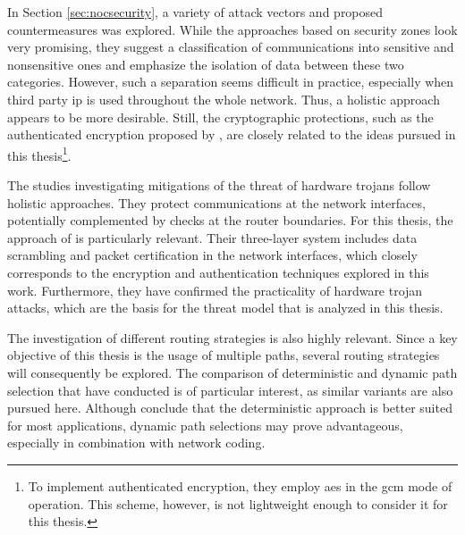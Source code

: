 In Section \ref{sec:nocsecurity}, a variety of attack vectors and proposed countermeasures was explored. While the approaches based on security zones
look very promising, they suggest a classification of communications into sensitive and nonsensitive ones and emphasize the isolation of data between these two
categories. However, such a separation seems difficult in practice, especially when third party \gls{ip} is used throughout the whole network. Thus, a
holistic approach appears to be more desirable. Still, the cryptographic protections, such as the authenticated encryption proposed by
\citeauthor{kapoor13nocauthenc} \cite{kapoor13nocauthenc}, are closely related to the ideas pursued in this thesis\footnote{To implement authenticated
encryption, they employ \gls{aes} in the \gls{gcm} mode of operation. This scheme, however, is not lightweight enough to consider it for this thesis.}.

The studies investigating mitigations of the threat of hardware trojans follow holistic approaches. They protect communications at the network
interfaces, potentially complemented by checks at the router boundaries. For this thesis, the approach of \citeauthor{ancajas14fortnocs}
\cite{ancajas14fortnocs} is particularly relevant. Their three-layer system includes data scrambling and packet certification in the network
interfaces, which closely corresponds to the encryption and authentication techniques explored in this work. Furthermore, they have confirmed the
practicality of hardware trojan attacks, which are the basis for the threat model that is analyzed in this thesis.

The investigation of different routing strategies is also highly relevant. Since a key objective of this thesis is the usage of multiple paths, several
routing strategies will consequently be explored. The comparison of deterministic and dynamic path selection that \citeauthor{stefan11enhancingnocs}
\cite{stefan11enhancingnocs} have conducted is of particular interest, as similar variants are also pursued here. Although
\citeauthor{stefan11enhancingnocs} conclude that the deterministic approach is better suited for most applications, dynamic path selections may prove
advantageous, especially in combination with network coding.

